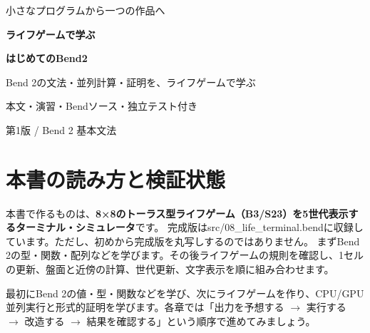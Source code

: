 \documentclass[11pt,a4paper,openany]{book}
\newcommand{\file}[1]{\textsf{\color{blue}#1}}
\newcommand{\term}[1]{\textbf{#1}}
\begin{document}
\frontmatter
\begin{titlepage}
  \pagecolor{paper}
  \vspace*{34mm}
  {\sffamily\fontsize{15}{19}\selectfont\color{blue} 小さなプログラムから一つの作品へ}\par
  \vspace{13mm}
  {\sffamily\bfseries\fontsize{22}{29}\selectfont\color{blue} ライフゲームで学ぶ\par}
  \vspace{5mm}
  {\sffamily\bfseries\fontsize{37}{48}\selectfont\color{ink} はじめてのBend2\par}
  \vspace{12mm}
  {\sffamily\Large Bend 2の文法・並列計算・証明を、ライフゲームで学ぶ}\par
  \vfill
  {\sffamily\large 本文・演習・Bendソース・独立テスト付き}\par
  \vspace{5mm}
  {\sffamily\large 第1版 \quad / \quad Bend 2 基本文法}\par
  \vspace{15mm}
\end{titlepage}
\nopagecolor
\chapter*{本書の読み方と検証状態}
本書で作るものは、\term{8×8のトーラス型ライフゲーム（B3/S23）を5世代表示するターミナル・シミュレータ}です。
完成版は\file{src/08\_life\_terminal.bend}に収録しています。ただし、初めから完成版を丸写しするのではありません。
まずBend 2の型・関数・配列などを学びます。その後ライフゲームの規則を確認し、1セルの更新、盤面と近傍の計算、世代更新、文字表示を順に組み合わせます。

最初にBend 2の値・型・関数などを学び、次にライフゲームを作り、CPU/GPU並列実行と形式的証明を学びます。各章では「出力を予想する $\rightarrow$ 実行する $\rightarrow$ 改造する $\rightarrow$ 結果を確認する」という順序で進めてみましょう。
\end{document}
